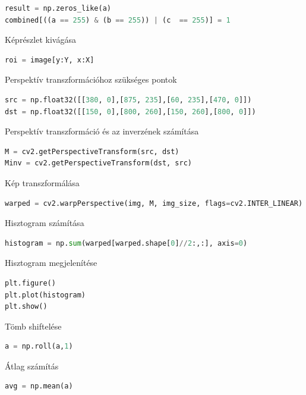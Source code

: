 \documentclass[12pt,a4paper,oneside]{report}             %
\begin{document}
\begin{lstlisting}[language=Python]
result = np.zeros_like(a)
combined[((a == 255) & (b == 255)) | (c  == 255)] = 1
\end{lstlisting}

Képrészlet kivágása

\begin{lstlisting}[language=Python]
roi = image[y:Y, x:X]
\end{lstlisting}

Perspektív transzformációhoz szükséges pontok

\begin{lstlisting}[language=Python]
src = np.float32([[380, 0],[875, 235],[60, 235],[470, 0]])
dst = np.float32([[150, 0],[800, 260],[150, 260],[800, 0]])
\end{lstlisting}

Perspektív transzformáció és az inverzének számítása

\begin{lstlisting}[language=Python]
M = cv2.getPerspectiveTransform(src, dst)
Minv = cv2.getPerspectiveTransform(dst, src)
\end{lstlisting}

Kép transzformálása

\begin{lstlisting}[language=Python]
warped = cv2.warpPerspective(img, M, img_size, flags=cv2.INTER_LINEAR)
\end{lstlisting}

Hisztogram számítása

\begin{lstlisting}[language=Python]
histogram = np.sum(warped[warped.shape[0]//2:,:], axis=0)
\end{lstlisting}

Hisztogram megjelenítése

\begin{lstlisting}[language=Python]
plt.figure()
plt.plot(histogram)
plt.show()
\end{lstlisting}

Tömb shiftelése

\begin{lstlisting}[language=Python]
a = np.roll(a,1)
\end{lstlisting}

Átlag számítás

\begin{lstlisting}[language=Python]
avg = np.mean(a)
\end{lstlisting}
\end{document}
